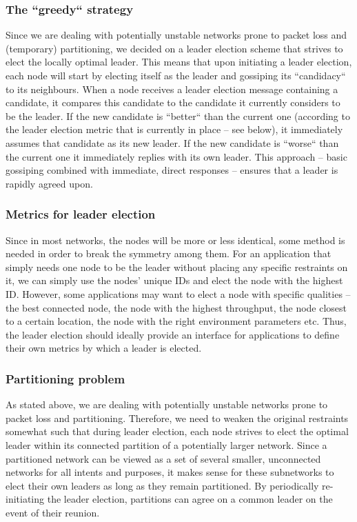 \documentclass[11pt,
  a4paper,
  ngerman,
  BCOR=7mm
]{scrartcl}
\begin{document}
\subsubsection*{The ``greedy`` strategy}
\label{ssub:greedy_leader_election}
Since we are dealing with potentially unstable networks prone to packet
loss and (temporary) partitioning, we decided on a leader election
scheme that strives to elect the locally optimal leader. This means that
upon initiating a leader election, each node will start by electing
itself as the leader and gossiping its ``candidacy`` to its neighbours.
When a node receives a leader election message containing a candidate,
it compares this candidate to the candidate it currently considers to be
the leader. If the new candidate is ``better`` than the current one
(according to the leader election metric that is currently in place --
see below), it immediately assumes that candidate as its new leader. If
the new candidate is ``worse`` than the current one it immediately
replies with its own leader. This approach -- basic gossiping combined
with immediate, direct responses -- ensures that a leader is rapidly
agreed upon.

\subsubsection*{Metrics for leader election}
\label{ssub:leader_election_metrics}
Since in most networks, the nodes will be more or less identical, some
method is needed in order to break the symmetry among them. For an
application that simply needs one node to be the leader without placing
any specific restraints on it, we can simply use the nodes' unique IDs
and elect the node with the highest ID. However, some applications may
want to elect a node with specific qualities -- the best connected node,
the node with the highest throughput, the node closest to a certain
location, the node with the right environment parameters etc. Thus, the
leader election should ideally provide an interface for applications to
define their own metrics by which a leader is elected.

\newpage

\subsubsection*{Partitioning problem}
\label{ssub:partitioning_problem}
As stated above, we are dealing with potentially unstable networks prone
to packet loss and partitioning. Therefore, we need to weaken the
original restraints somewhat such that during leader election, each node
strives to elect the optimal leader within its connected partition of
a potentially larger network. Since a partitioned network can be viewed
as a set of several smaller, unconnected networks for all intents and
purposes, it makes sense for these subnetworks to elect their own
leaders as long as they remain partitioned. By periodically
re-initiating the leader election, partitions can agree on a common
leader on the event of their reunion.
\end{document}
